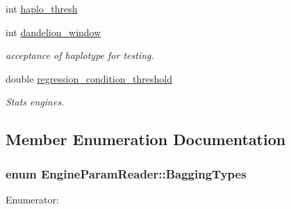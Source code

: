 \begin{DoxyCompactItemize}
\item 
int \hyperlink{classEngineParamReader_a1a4228fe387a551cc84e1f45e4e55aca}{haplo\_\-thresh}
\item 
int \hyperlink{classEngineParamReader_a9a843b871678893b7c8968de092f4b48}{dandelion\_\-window}
\begin{DoxyCompactList}\small\item\em acceptance of haplotype for testing. \item\end{DoxyCompactList}\item 
double \hyperlink{classEngineParamReader_a3c9b1f9d8ed6b84647e3321faeadabfc}{regression\_\-condition\_\-threshold}
\begin{DoxyCompactList}\small\item\em Stats engines. \item\end{DoxyCompactList}\end{DoxyCompactItemize}


\subsection{Member Enumeration Documentation}
\hypertarget{classEngineParamReader_ab2ee80aa67ba657beddf852c526e1a3d}{
\subsubsection[{BaggingTypes}]{\setlength{\rightskip}{0pt plus 5cm}enum {\bf EngineParamReader::BaggingTypes}}}
\label{classEngineParamReader_ab2ee80aa67ba657beddf852c526e1a3d}
\begin{Desc}
\item[Enumerator: ]\par
\begin{description}
\item[{\em 
\hypertarget{classEngineParamReader_ab2ee80aa67ba657beddf852c526e1a3dad564d072511cbff180a2f017a20eb842}{
ALL}
\label{classEngineParamReader_ab2ee80aa67ba657beddf852c526e1a3dad564d072511cbff180a2f017a20eb842}
}]\item[{\em 
\hypertarget{classEngineParamReader_ab2ee80aa67ba657beddf852c526e1a3daa474dec3c26cb72fb2762ce5c9a6ddf0}{
LEAVES}
\label{classEngineParamReader_ab2ee80aa67ba657beddf852c526e1a3daa474dec3c26cb72fb2762ce5c9a6ddf0}
}]\item[{\em 
\hypertarget{classEngineParamReader_ab2ee80aa67ba657beddf852c526e1a3da84d0e6978fb6ad03ff1095742531abd9}{
SUBTREE}
\label{classEngineParamReader_ab2ee80aa67ba657beddf852c526e1a3da84d0e6978fb6ad03ff1095742531abd9}
}]\end{description}
\end{Desc}



